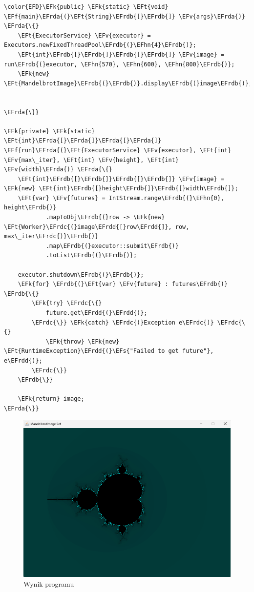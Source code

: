 \documentclass[11pt]{article}
\newcommand{\EFs}[1]{\textcolor{EFs}{#1}} %
\newcommand{\EFk}[1]{\textcolor{EFk}{#1}} %
\newcommand{\EFf}[1]{\textcolor{EFf}{#1}} %
\newcommand{\EFv}[1]{\textcolor{EFv}{#1}} %
\newcommand{\EFt}[1]{\textcolor{EFt}{#1}} %
\newcommand{\EFhn}[1]{\textcolor{EFhn}{#1}} %
\newcommand{\EFrda}[1]{#1} %
\newcommand{\EFrdb}[1]{\textcolor{EFrdb}{#1}} %
\newcommand{\EFrdc}[1]{\textcolor{EFrdc}{#1}} %
\newcommand{\EFrdd}[1]{\textcolor{EFrdd}{#1}} %
\begin{document}
\begin{Code}
\begin{Verbatim}
\color{EFD}\EFk{public} \EFk{static} \EFt{void} \EFf{main}\EFrda{(}\EFt{String}\EFrdb{[}\EFrdb{]} \EFv{args}\EFrda{)} \EFrda{\{}
    \EFt{ExecutorService} \EFv{executor} = Executors.newFixedThreadPool\EFrdb{(}\EFhn{4}\EFrdb{)};
    \EFt{int}\EFrdb{[}\EFrdb{]}\EFrdb{[}\EFrdb{]} \EFv{image} = run\EFrdb{(}executor, \EFhn{570}, \EFhn{600}, \EFhn{800}\EFrdb{)};
    \EFk{new} \EFt{MandelbrotImage}\EFrdb{(}\EFrdb{)}.display\EFrdb{(}image\EFrdb{)};


\EFrda{\}}

\EFk{private} \EFk{static} \EFt{int}\EFrda{[}\EFrda{]}\EFrda{[}\EFrda{]} \EFf{run}\EFrda{(}\EFt{ExecutorService} \EFv{executor}, \EFt{int} \EFv{max\_iter}, \EFt{int} \EFv{height}, \EFt{int} \EFv{width}\EFrda{)} \EFrda{\{}
    \EFt{int}\EFrdb{[}\EFrdb{]}\EFrdb{[}\EFrdb{]} \EFv{image} = \EFk{new} \EFt{int}\EFrdb{[}height\EFrdb{]}\EFrdb{[}width\EFrdb{]};
    \EFt{var} \EFv{futures} = IntStream.range\EFrdb{(}\EFhn{0}, height\EFrdb{)}
            .mapToObj\EFrdb{(}row -> \EFk{new} \EFt{Worker}\EFrdc{(}image\EFrdd{[}row\EFrdd{]}, row, max\_iter\EFrdc{)}\EFrdb{)}
            .map\EFrdb{(}executor::submit\EFrdb{)}
            .toList\EFrdb{(}\EFrdb{)};

    executor.shutdown\EFrdb{(}\EFrdb{)};
    \EFk{for} \EFrdb{(}\EFt{var} \EFv{future} : futures\EFrdb{)} \EFrdb{\{}
        \EFk{try} \EFrdc{\{}
            future.get\EFrdd{(}\EFrdd{)};
        \EFrdc{\}} \EFk{catch} \EFrdc{(}Exception e\EFrdc{)} \EFrdc{\{}
            \EFk{throw} \EFk{new} \EFt{RuntimeException}\EFrdd{(}\EFs{"Failed to get future"}, e\EFrdd{)};
        \EFrdc{\}}
    \EFrdb{\}}

    \EFk{return} image;
\EFrda{\}}
\end{Verbatim}
\end{Code}


\begin{figure}[H]
\centering
\includegraphics[width=1.0\textwidth]{./manedelbrot.png}
\caption{Wynik programu}
\end{figure}
\end{document}
